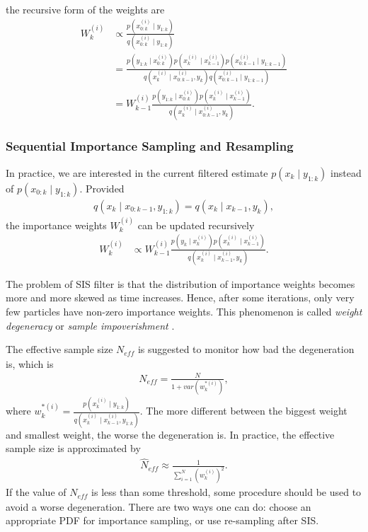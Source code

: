 the recursive form of the weights are
\begin{align*}
W_k^{(i)} &\propto \frac{p(x_{0:k}^{(i)}\mid y_{1:k})}{q(x_{0:k}^{(i)}\mid y_{1:k})}\\
&= \frac{ p(y_{1:k}\mid x_{0:k}^{(i)}) p(x_{k}^{(i)}\mid x_{k-1}^{(i)})  p(x_{0:k-1}^{(i)}\mid y_{1:k-1})}   { q(x_{k}^{(i)}\mid x_{0:k-1}^{(i)},y_{k})  q(x_{0:k-1}^{(i)}\mid y_{1:k-1}) } \\
&= W_{k-1}^{(i)} \frac{ p(y_{1:k}\mid x_{0:k}^{(i)}) p(x_{k}^{(i)}\mid x_{k-1}^{(i)}) }   {q(x_{k}^{(i)}\mid x_{0:k-1}^{(i)},y_{k})}.
\end{align*}

\subsubsection{Sequential Importance Sampling and Resampling}
 
In practice, we are interested in the current filtered estimate $p(x_k\mid y_{1:k})$ instead of $p(x_{0:k}\mid y_{1:k})$. Provided 
\begin{align*}
q(x_k\mid  x_{0:k-1},y_{1:k})=q(x_k\mid  x_{k-1},y_k),
\end{align*}
the importance weights $W_k^{(i)}$ can be updated recursively
\begin{align*}
W_k^{(i)} &\propto W_{k-1}^{(i)} \frac{ p(y_k\mid x_k^{(i)}) p(x_{k}^{(i)}\mid x_{k-1}^{(i)}) }   {q(x_{k}^{(i)}\mid x_{k-1}^{(i)},y_{k})}.
\end{align*}

The problem of SIS filter is that the distribution of importance weights becomes more and more skewed as time increases. Hence, after some iterations, only very few particles have non-zero importance weights. This phenomenon is called \textit{weight degeneracy} or \textit{sample impoverishment} \cite{smcmip2011}.

The effective sample size $\textit{N}_{\textit{eff}}$ is suggested to monitor how bad the degeneration is, which is
\begin{align*}
\textit{N}_{\textit{eff}}=\frac{N}{1+var(w_k^{*(i)})},
\end{align*}
where $w_k^{*(i)}=\frac{p(x_k^{(i)}\mid y_{1:k})}{q(x_k^{(i)}\mid x_{k-1}^{(i)},y_{1:k})}$. The more different between the biggest weight and smallest weight, the worse the degeneration is. In practice, the effective sample size is approximated by
\begin{align*}
\hat{N}_{\textit{eff}}\approx \frac{1}{\sum_{i=1}^{N}(w_k^{(i)})^2}.
\end{align*}
If the value of $\textit{N}_{\textit{eff}}$ is less than some threshold, some procedure should be used to avoid a worse degeneration. There are two ways one can do: choose an appropriate PDF for importance sampling, or use re-sampling after SIS. 

